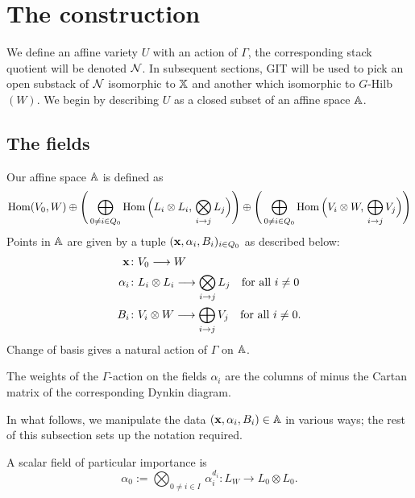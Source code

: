 \documentclass{amsart}
\theoremstyle{definition}
\begin{document}
\section{The construction}

We define an affine variety $U$ with an action of $\Gamma$, the corresponding stack quotient will be denoted $\mathcal{N}$.
In subsequent sections, GIT will be used to pick an open substack of $\mathcal{N}$ isomorphic to $\mathbb{X}$ and another which isomorphic to $G$-Hilb$(W)$.
We begin by describing $U$ as a closed subset of an affine space $\mathbb{A}$.

\subsection{The fields}
Our affine space $\mathbb{A}$ is defined as
\begin{equation*}
    \operatorname{Hom}(V_0,W) \oplus \Bigg(\bigoplus_{0\neq i \in Q_0} \operatorname{Hom}\Big(L_i \otimes L_i,\, \bigotimes_{i \rightarrow j} L_j\Big) \Bigg) \oplus  \Bigg(\bigoplus_{0\neq i \in Q_0} \operatorname{Hom}\Big(V_i \otimes W,\, \bigoplus_{i \rightarrow j} V_j\Big) \Bigg)
\end{equation*}
Points in $\mathbb{A}$ are given by a tuple $(\mathbf{x},\alpha_i, B_i)_{i \in Q_0}$ as described below:
\begin{align}
\mathbf{x} \colon &V_0 \longrightarrow W \label{fd:x} \\
\alpha_i \colon &L_i \otimes L_i \longrightarrow \bigotimes_{i \rightarrow j} L_j \quad \text{for all} \,\, i\neq 0 \label{fd:alpha} \\
 B_i \colon &V_i \otimes W \longrightarrow \bigoplus_{i \rightarrow j} V_j \quad \text{for all} \,\, i\neq 0. \label{fd:B}
\end{align}
Change of basis gives a natural action of $\Gamma$ on $\mathbb{A}$.

\begin{remark}\label{rm:cartan}
The weights of the $\Gamma$-action on the fields $\alpha_i$ are the columns of minus the Cartan matrix of the corresponding Dynkin diagram.
\end{remark}

In what follows, we manipulate the data $(\mathbf{x}, \alpha_i, B_i) \in \mathbb{A}$ in various ways; the rest of this subsection sets up the notation required.

\begin{notation}
A scalar field of particular importance is $$\alpha_0:= \bigotimes_{0 \neq i \in I} \,\alpha_i^{d_i}: L_W \rightarrow L_0 \otimes L_0.$$
\end{notation}
\end{document}
